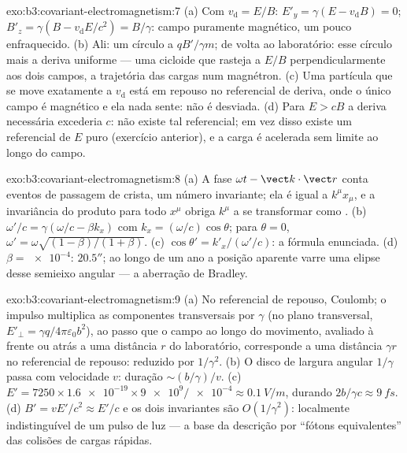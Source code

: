 \begin{solution}{exo:b3:covariant-electromagnetism:7}
(a) Com $v_{\text{d}} = E/B$: $E'_y = \gamma(E - v_{\text{d}}B) =
0$; $B'_z = \gamma(B - v_{\text{d}}E/c^2) = B/\gamma$: campo
puramente magnético, um pouco enfraquecido. (b) Ali: um círculo a
$qB'/\gamma m$; de volta ao laboratório: esse círculo mais a deriva
uniforme --- uma cicloide que rasteja a $E/B$ perpendicularmente aos
dois campos, a trajetória das cargas num magnétron. (c) Uma partícula
que se move exatamente a $v_{\text{d}}$ está em repouso no referencial
de deriva, onde o único campo é magnético e ela nada sente: não é
desviada. (d) Para $E > cB$ a deriva necessária excederia $c$: não
existe tal referencial; em vez disso existe um referencial de $E$ puro
(exercício anterior), e a carga é acelerada sem limite ao longo do
campo.
\end{solution}

\begin{solution}{exo:b3:covariant-electromagnetism:8}
(a) A fase $\omega t - \vect k\cdot\vect r$ conta eventos de passagem
de crista, um número invariante; ela é igual a $k^\mu x_\mu$, e a
invariância do produto para todo $x^\mu$ obriga $k^\mu$ a se
transformar como . (b) $\omega'/c = \gamma(\omega/c -
\beta k_x)$ com $k_x = (\omega/c)\cos\theta$; para $\theta = 0$,
$\omega' = \omega\sqrt{(1-\beta)/(1+\beta)}$. (c) $\cos\theta' =
k'_x/(\omega'/c)$: a fórmula enunciada. (d) $\beta = \num{e-4}$:
$20.5''$; ao longo de um ano a posição aparente varre uma elipse desse
semieixo angular --- a aberração de Bradley.
\end{solution}

\begin{solution}{exo:b3:covariant-electromagnetism:9}
(a) No referencial de repouso, Coulomb; o impulso multiplica as
componentes transversais por $\gamma$ (no plano transversal,
$E'_\perp = \gamma
q/4\pi\varepsilon_0b^2$), ao passo que o campo ao longo do movimento,
avaliado à frente ou atrás a uma distância $r$ do laboratório,
corresponde a uma distância $\gamma r$ no referencial de repouso:
reduzido por $1/\gamma^2$. (b) O disco de largura angular
$1/\gamma$ passa com velocidade $v$: duração $\sim (b/\gamma)/v$. (c)
$E' = 7250 \times \num{1.6e-19} \times \num{9e9}/\num{e-4} \approx
\qty{0.1}{V/m}$, durando $2b/\gamma c \approx \qty{9}{fs}$. (d)
$B' = vE'/c^2 \approx E'/c$ e os dois invariantes são $O(1/\gamma^2)$:
localmente indistinguível de um pulso de luz --- a base da descrição
por ``fótons equivalentes'' das colisões de cargas rápidas.
\end{solution}

